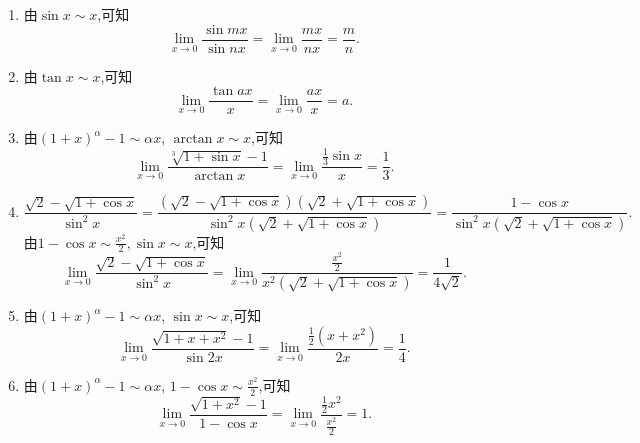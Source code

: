 \begin{solution}
    \begin{enumerate}[(1)]
        \item 由$\sin x \sim x$,可知$$\lim_{x \to 0} \frac{\sin mx}{\sin nx} = \lim_{x \to 0} \frac{mx}{nx} = \frac{m}{n}.$$
        \item 由$\tan x \sim x$,可知$$\lim_{x \to 0} \frac{\tan ax}{x} = \lim_{x \to 0} \frac{ax}{x} = a.$$
        \item 由$(1+x)^\alpha - 1 \sim \alpha x$, $\arctan x \sim x$,可知$$\lim_{x \to 0} \frac{\sqrt[3]{1+\sin x}-1}{\arctan x} = \lim_{x \to 0} \frac{\frac{1}{3} \sin x}{x} = \frac{1}{3}.$$
        \item $$\frac{\sqrt{2}-\sqrt{1+\cos x}}{\sin^2 x} = \frac{(\sqrt{2}-\sqrt{1+\cos x})(\sqrt{2}+\sqrt{1+\cos x})}{\sin^2 x (\sqrt{2}+\sqrt{1+\cos x})} = \frac{1 - \cos x}{\sin^2 x (\sqrt{2}+\sqrt{1+\cos x})}.$$
              由$1 - \cos x \sim \frac{x^2}{2}, \sin x \sim x$,可知$$\lim_{x \to 0} \frac{\sqrt{2}-\sqrt{1+\cos x}}{\sin^2 x} = \lim_{x \to 0} \frac{\frac{x^2}{2}}{x^2 (\sqrt{2} + \sqrt{1 + \cos x})} = \frac{1}{4\sqrt{2}}.$$
        \item 由$(1+x)^\alpha - 1 \sim \alpha x$, $\sin x \sim x$,可知$$\lim_{x \to 0} \frac{\sqrt{1+x+x^2}-1}{\sin 2x} = \lim_{x \to 0} \frac{\frac{1}{2}(x + x^2)}{2x} = \frac{1}{4}.$$
        \item 由$(1+x)^\alpha - 1 \sim \alpha x$, $1 - \cos x \sim \frac{x^2}{2}$,可知$$\lim_{x \to 0} \frac{\sqrt{1+x^2}-1}{1-\cos x} = \lim_{x \to 0} \frac{\frac{1}{2} x^2}{\frac{x^2}{2}} = 1.$$
    \end{enumerate}
\end{solution}